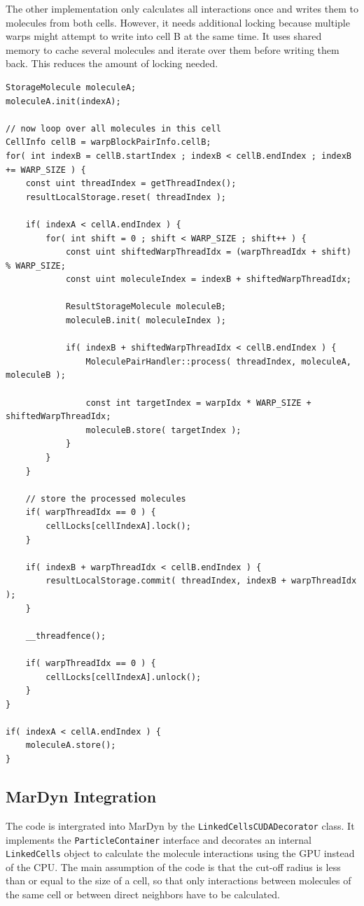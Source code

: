 The other implementation only calculates all interactions once and writes them to molecules from both cells. However, it needs additional locking because multiple warps might attempt to write into cell B at the same time. It uses shared memory to cache several molecules and iterate over them before writing them back. This reduces the amount of locking needed.

\begin{lstlisting}[caption=inter-cell block processing with shared memory cache(warp block cell processor)]
StorageMolecule moleculeA;
moleculeA.init(indexA);

// now loop over all molecules in this cell
CellInfo cellB = warpBlockPairInfo.cellB;
for( int indexB = cellB.startIndex ; indexB < cellB.endIndex ; indexB += WARP_SIZE ) {
	const uint threadIndex = getThreadIndex();
	resultLocalStorage.reset( threadIndex );

	if( indexA < cellA.endIndex ) {
		for( int shift = 0 ; shift < WARP_SIZE ; shift++ ) {
			const uint shiftedWarpThreadIdx = (warpThreadIdx + shift) % WARP_SIZE;
			const uint moleculeIndex = indexB + shiftedWarpThreadIdx;

			ResultStorageMolecule moleculeB;
			moleculeB.init( moleculeIndex );

			if( indexB + shiftedWarpThreadIdx < cellB.endIndex ) {
				MoleculePairHandler::process( threadIndex, moleculeA, moleculeB );

				const int targetIndex = warpIdx * WARP_SIZE + shiftedWarpThreadIdx;
				moleculeB.store( targetIndex );
			}
		}
	}

	// store the processed molecules
	if( warpThreadIdx == 0 ) {
		cellLocks[cellIndexA].lock();
	}

	if( indexB + warpThreadIdx < cellB.endIndex ) {
		resultLocalStorage.commit( threadIndex, indexB + warpThreadIdx );
	}

	__threadfence();

	if( warpThreadIdx == 0 ) {
		cellLocks[cellIndexA].unlock();
	}
}

if( indexA < cellA.endIndex ) {
	moleculeA.store();
}
\end{lstlisting}

\subsection{MarDyn Integration}
The \cuda{} code is intergrated into MarDyn by the \lstinline!LinkedCellsCUDADecorator! class. It implements the \lstinline!ParticleContainer! interface and decorates an internal \lstinline!LinkedCells! object to calculate the molecule interactions using the GPU instead of the CPU.
The main assumption of the code is that the cut-off radius is less than or equal to the size of a cell, so that only interactions between molecules of the same cell or between direct neighbors have to be calculated.

